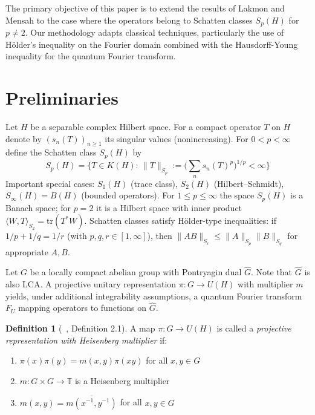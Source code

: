 \documentclass[11pt,a4paper]{article}
\theoremstyle{definition}
\newtheorem{definition}[theorem]{Definition}
\newcommand{\Ghat}{\widehat{G}}
\begin{document}
The primary objective of this paper is to extend the results of Lakmon and Mensah \cite{LakmonMensah2025} to the case where the operators belong to Schatten classes $S_p(H)$ for $p \neq 2$. Our methodology adapts classical techniques, particularly the use of Hölder's inequality on the Fourier domain combined with the Hausdorff-Young inequality for the quantum Fourier transform.
\section{Preliminaries}


Let \(H\) be a separable complex Hilbert space. For a compact operator \(T\) on \(H\) denote by \((s_n(T))_{n\ge1}\) its singular values (nonincreasing). For \(0<p<\infty\) define the Schatten class \(S_p(H)\) by
\[
S_p(H) = \bigg\{ T\in K(H): \, \|T\|_{S_p}:= \bigg(\sum_{n}s_n(T)^p\bigg)^{1/p}<\infty\bigg\}
\]
Important special cases: \(S_1(H)\) (trace class), \(S_2(H)\) (Hilbert--Schmidt), \(S_\infty(H)=B(H)\) (bounded operators). For \(1\le p\le\infty\) the space \(S_p(H)\) is a Banach space; for \(p=2\) it is a Hilbert space with inner product \(\langle W,T\rangle_{S_2}=\mathrm{tr}(T^*W)\). Schatten classes satisfy Hölder-type inequalities: if \(1/p+1/q=1/r\) (with \(p,q,r\in[1,\infty]\)), then \(\|AB\|_{S_r}\le \|A\|_{S_p}\|B\|_{S_q}\) for appropriate \(A,B\).


Let $G$ be a locally compact abelian  group with Pontryagin dual $\Ghat$. Note that $\Ghat$ is also LCA. A projective unitary representation \(\pi:G\to U(H)\) with multiplier \(m\) yields, under additional integrability assumptions, a quantum Fourier transform \(F_U\) mapping operators to functions on \(\widehat G\). 







\begin{definition}[~\cite{LakmonMensah2025}, Definition 2.1]
A map $\pi: G \to U(H)$ is called a \emph{projective representation with Heisenberg multiplier} if:
\begin{enumerate}
\item $\pi(x)\pi(y) = m(x,y)\pi(xy)$ for all $x,y \in G$
\item $m: G \times G \to \mathbb{T}$ is a Heisenberg multiplier
\item $m(x,y) = \overline{m(x^{-1}, y^{-1})}$ for all $x,y \in G$
\end{enumerate}
\end{definition}
\end{document}
